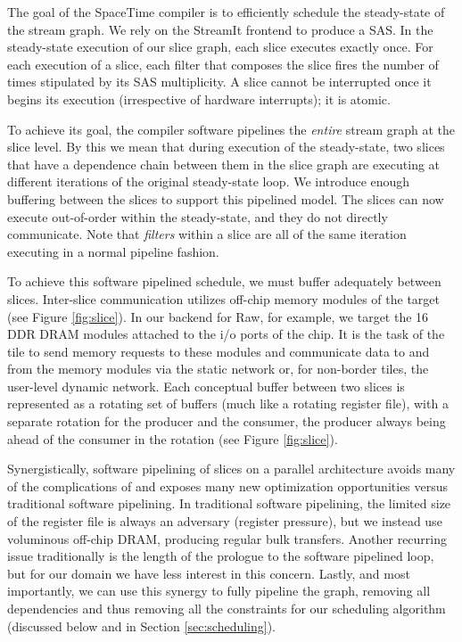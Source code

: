 The goal of the SpaceTime compiler is to efficiently schedule the
steady-state of the stream graph.  We rely on the StreamIt frontend to
produce a SAS.  In the steady-state execution of our slice graph, each
slice executes exactly once. For each execution of a slice, each
filter that composes the slice fires the number of times stipulated by
its SAS multiplicity.  A slice cannot be interrupted once it begins
its execution (irrespective of hardware interrupts); it is atomic.

To achieve its goal, the compiler software pipelines the {\it entire}
stream graph at the slice level. By this we mean that during execution
of the steady-state, two slices that have a dependence chain between
them in the slice graph are executing at different iterations of the
original steady-state loop.  We introduce enough buffering between the
slices to support this pipelined model. The slices can now execute
out-of-order within the steady-state, and they do not directly
communicate.  Note that {\it filters} within a slice are all of the
same iteration executing in a normal pipeline fashion.

To achieve this software pipelined schedule, we must buffer adequately
between slices.  Inter-slice communication utilizes off-chip memory
modules of the target (see Figure \ref{fig:slice}).  In our backend
for Raw, for example, we target the 16 DDR DRAM modules attached to
the i/o ports of the chip.  It is the task of the tile to send memory
requests to these modules and communicate data to and from the memory
modules via the static network or, for non-border tiles, the
user-level dynamic network.  Each conceptual buffer between two slices
is represented as a rotating set of buffers (much like a rotating
register file), with a separate rotation for the producer and the
consumer, the producer always being ahead of the consumer in the
rotation (see Figure \ref{fig:slice}).

Synergistically, software pipelining of slices on a parallel
architecture avoids many of the complications of and exposes many new
optimization opportunities versus traditional software pipelining.  In
traditional software pipelining, the limited size of the register file
is always an adversary (register pressure), but we instead use
voluminous off-chip DRAM, producing regular bulk transfers.  Another
recurring issue traditionally is the length of the prologue to the
software pipelined loop, but for our domain we have less interest in
this concern.  Lastly, and most importantly, we can use this synergy
to fully pipeline the graph, removing all dependencies and thus
removing all the constraints for our scheduling algorithm (discussed
below and in Section \ref{sec:scheduling}).

